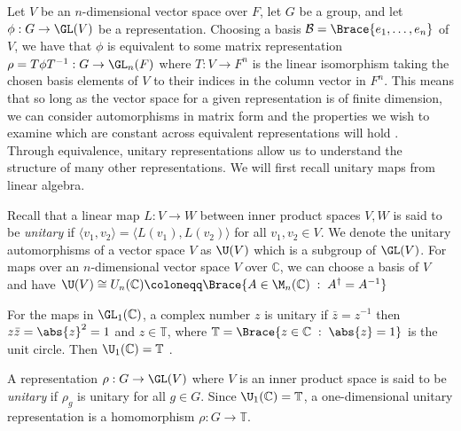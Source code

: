 \documentclass[../Project.tex]{subfiles}
\begin{document}
Let $V$ be an $n$-dimensional vector space over $F$, let $G$ be a group, and let $\phi : G \to \GL(V)$ be a representation. Choosing a basis $\mathcal{B} = \Brace{e_1,\dots,e_n}$ of $V$, we have that $\phi$ is equivalent to some matrix representation $\rho = T\phi T^{-1} : G \to \GL_n(F)$ where $T : V \to F^n$ is the linear isomorphism taking the chosen basis elements of $V$ to their indices in the column vector in $F^n$. This means that so long as the vector space for a given representation is of finite dimension, we can consider automorphisms in matrix form and the properties we wish to examine which are constant across equivalent representations will hold \cite[page 21]{1}.\\




Through equivalence, unitary representations allow us to understand the structure of many other representations. We will first recall unitary maps from linear algebra.

\begin{defi}
	Recall that a linear map $L : V \to W$ between inner product spaces $V,W$ is said to be \textit{unitary} if $\langle v_1, v_2\rangle  = \langle L(v_1), L(v_2) \rangle$ for all $v_1,v_2 \in V$.
	We denote the unitary automorphisms of a vector space $V$ as $\U(V)$ which is a subgroup of $\GL(V)$. For maps over an $n$-dimensional vector space $V$ over $\mathbb{C}$, we can choose a basis of $V$ and have $\U(V) \cong U_n(\mathbb{C}) \coloneqq \Brace{A \in \M_n(\mathbb{C}) \;:\; A^\dagger = A^{-1}}$ 
\end{defi}

	For the maps in $\GL_1(\mathbb{C})$, a complex number $z$ is unitary if $\bar{z} =  {z}^{-1}$ then  $z\bar{z} = \abs{z}^2 = 1$ and $z \in \mathbb{T}$, where $\mathbb{T} = \Brace{z \in \mathbb{C}\;:\;\abs{z} = 1}$ is the unit circle. Then $\U_1(\mathbb{C}) = \mathbb{T}$ \cite[page 20]{1}.

\begin{defi}
	A representation $\rho : G \to \GL(V)$ where $V$ is an inner product space is said to be \textit{unitary} if $\rho_g$ is unitary for all $g \in G$. Since $\U_1(\mathbb{C}) = \mathbb{T}$, a one-dimensional unitary representation is a homomorphism $\rho : G \to \mathbb{T}$.
\end{defi}
\end{document}
